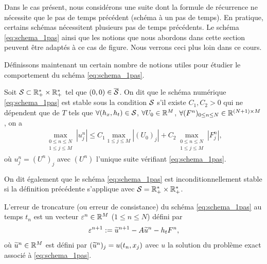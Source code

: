 \documentclass[12pt,a4paper,twoside]{article}
\begin{document}
\begin{remark}
  Dans le cas pr\'esent, nous consid\'erons une suite dont la formule de r\'ecurrence
  ne n\'ecessite que le pas de temps pr\'ec\'edent (sch\'ema \`a un pas de temps).
  En pratique, certains sch\'emas n\'ecessitent plusieurs pas de temps pr\'ec\'edents.
  Le sch\'ema \eqref{eq:schema_1pas} ainsi que les notions que nous abordons dans cette
  section peuvent \^etre adapt\'es \`a ce cas de figure.
  Nous verrons ceci plus loin dans ce cours.
\end{remark}

D\'efinissons maintenant un certain nombre de notions utiles pour
\'etudier le comportement du sch\'ema \eqref{eq:schema_1pas}.
\begin{definition}[Stabilit\'e]
  \label{def:stabilite}
  Soit $\mathcal{S} \subset \mathbb{R}_+^* \times \mathbb{R}_+^*$ tel que $(0,0) \in \overline{\mathcal{S}}$.
  On dit que le sch\'ema num\'erique \eqref{eq:schema_1pas} est stable 
  sous la condition $\mathcal{S}$ s'il existe $C_1 , C_2 > 0$ qui ne d\'ependent que de $T$
  tels que $\forall (h_x , h_t) \in \mathcal{S}$, $\forall U_0 \in \mathbb{R}^{M}$, 
  $\forall (F^n)_{0 \leq n \leq N} \in \mathbb{R}^{(N+1) \times M}$, on a
  \begin{align}
    \max_{\substack{0\leq n \leq N\\ 1 \leq j \leq M}} | u_j^n | 
    \leq C_1 \max_{1 \leq j \leq M} | (U_0)_j | 
    + C_2 \max_{\substack{0\leq n \leq N\\ 1 \leq j \leq M}} | F_j^n | ,
  \end{align}
  o\`u $u_j^n = (U^n)_j$ avec $(U^n)$ l'unique suite v\'erifiant \eqref{eq:schema_1pas}.

  On dit \'egalement que le sch\'ema \eqref{eq:schema_1pas} 
  est inconditionnellement stable
  si la d\'efinition pr\'ec\'edente
  s'applique avec $\mathcal{S} = \mathbb{R}_+^* \times \mathbb{R}_+^*$.
\end{definition}

\begin{definition}
  \label{def:troncature}
  L'erreur de troncature (ou erreur de consistance) du sch\'ema \eqref{eq:schema_1pas}
  au temps $t_n$ est un vecteur $\varepsilon^n \in \mathbb{R}^{M}$
  ($1 \leq n \leq N$)
  d\'efini par
  \begin{align}
    \label{eq:troncature}
    \varepsilon^{n+1} := \widetilde{u}^{n+1} - A \widetilde{u}^n - h_t F^n ,
  \end{align}
  o\`u $\widetilde{u}^n \in \mathbb{R}^{M}$ est d\'efini par
  $(\widetilde{u}^n)_j = u(t_n,x_j)$ avec $u$ la solution du probl\`eme exact associ\'e \`a
  \eqref{eq:schema_1pas}.
\end{definition}
\end{document}
